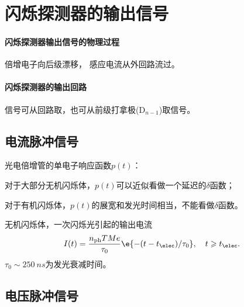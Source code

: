 \section{闪烁探测器的输出信号}

\paragraph{闪烁探测器输出信号的物理过程}
倍增电子向后级漂移，
感应电流从外回路流过。
\paragraph{闪烁探测器的输出回路}
信号可从回路取，也可从前级打拿极(D$_{n-1}$)取信号。

\subsection{电流脉冲信号}

光电倍增管的单电子响应函数$p(t)$：
\begin{compactitem}
	\item 对于大部分无机闪烁体，$p(t)$可以近似看做一个延迟的$\delta$函数；
	\item 对于有机闪烁体，$p(t)$的展宽和发光时间相当，不能看做$\delta$函数。
\end{compactitem}
无机闪烁体，一次闪烁光引起的输出电流
\[
	I(t)=\frac{n_{\mathrm{ph}}TMe}{\tau_0}\e{-(t-t_\elec)/\tau_0},\quad t\geqslant t_\elec.
\]
$\tau_0\sim\SI{250}{ns}$为发光衰减时间。

\subsection{电压脉冲信号}

